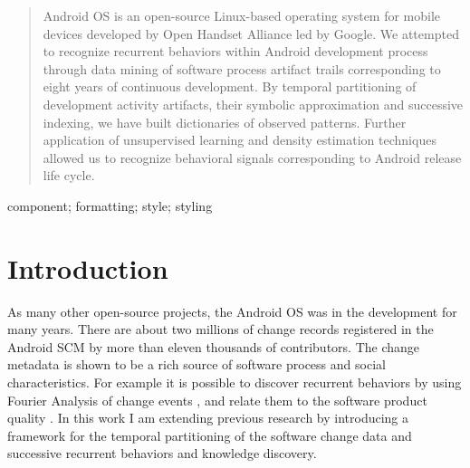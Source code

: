 \documentclass[10pt, conference, compsocconf]{IEEEtran}
\begin{document}
\maketitle


\begin{abstract}
Android OS is an open-source Linux-based operating system for mobile devices developed by 
Open Handset Alliance led by Google. We attempted to recognize recurrent behaviors within 
Android development process through data mining of software process artifact trails 
corresponding to eight years of continuous development. 
By temporal partitioning of development activity artifacts, their symbolic approximation 
and successive indexing, we have built dictionaries of observed patterns. 
Further application of unsupervised learning and density estimation techniques allowed us 
to recognize behavioral signals corresponding to Android release life cycle.

\end{abstract}

\begin{IEEEkeywords}
component; formatting; style; styling

\end{IEEEkeywords}


%
\IEEEpeerreviewmaketitle



\section{Introduction}
As many other open-source projects, the Android OS was in the development for many years. 
There are about two millions of change records registered in the Android SCM by more than 
eleven thousands of contributors. The change metadata is shown to be a rich source of 
software process and social characteristics. For example it is possible to discover recurrent 
behaviors by using Fourier Analysis of change events \cite{citeulike:10377345}, and relate
them to the software product quality \cite{citeulike:10392277}. In this work I am extending 
previous research by introducing a framework for the temporal partitioning of the software 
change data and successive recurrent behaviors and knowledge discovery.
\end{document}
